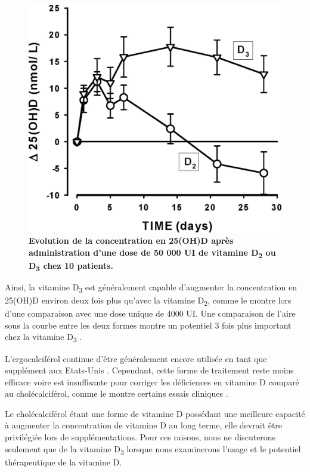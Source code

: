 \documentclass[
  a4paper,
  DIV=11,
  numbers=noendperiod,
  listof=totoc]{scrreprt}
\begin{document}
\begin{figure}

{\centering \includegraphics{figures/PK_D2_vs_D3.jpeg}

}

\caption{\label{fig-PK}\textbf{Evolution de la concentration en 25(OH)D
après administration d'une dose de 50 000 UI de vitamine
D\textsubscript{2} ou D\textsubscript{3} chez 10 patients.}
\autocite{Armas.2004}}

\end{figure}

Ainsi, la vitamine D\textsubscript{3} est généralement capable
d'augmenter la concentration en 25(OH)D environ deux fois plus qu'avec
la vitamine D\textsubscript{2}, comme le montre \textcite{Trang.1998}
lors d'une comparaison avec une dose unique de 4000 UI. Une comparaison
de l'aire sous la courbe entre les deux formes montre un potentiel 3
fois plus important chez la vitamine D\textsubscript{3}
\autocite{Armas.2004}.

L'ergocalciférol continue d'être généralement encore utilisée en tant
que supplément aux Etats-Unis \autocite{Houghton.2006}. Cependant, cette
forme de traitement reste moins efficace voire est insuffisante pour
corriger les déficiences en vitamine D comparé au cholécalciférol, comme
le montre certains essais cliniques \autocite{Boyle.2005}.

Le cholécalciférol étant une forme de vitamine D possédant une meilleure
capacité à augmenter la concentration de vitamine D au long terme, elle
devrait être privilégiée lors de supplémentations. Pour ces raisons,
nous ne discuterons seulement que de la vitamine D\textsubscript{3}
lorsque nous examinerons l'usage et le potentiel thérapeutique de la
vitamine D.
\end{document}
